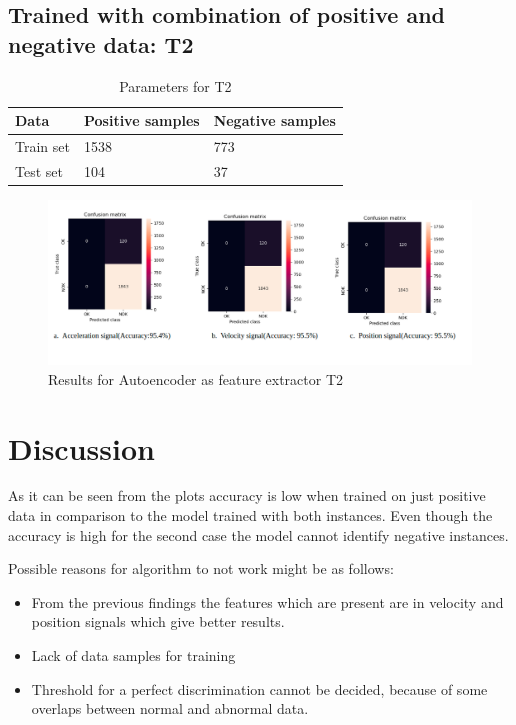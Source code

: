     \subsection{Trained with combination of positive  and negative data: T2}
   \begin{table}[h]
   	\begin{tabular}{|l|l|l|}
   		\hline
   		Data      & Positive samples & Negative samples \\ \hline
   		Train set & 1538             & 773              \\ \hline
   		Test set  & 104              & 37               \\ \hline
   	\end{tabular}
   	   	\caption{Parameters for T2}
   \end{table}
       \begin{figure}[h]
       	\centering
       	\includegraphics[width=1\linewidth]{images/rr8.png}
       	\caption{Results for Autoencoder as feature extractor T2}
       	\label{kk}
       \end{figure}
   \section{Discussion}
   As it can be seen from the plots accuracy is low when trained on just positive data in comparison to the model trained with both instances. Even though the accuracy is high for the second case the model cannot identify negative instances.
     
   Possible reasons for algorithm to not work might be as follows:
   \begin{itemize}
   	\item From the previous findings the features which are present are in velocity and position signals which give better results.
   	\item Lack of data samples for training 
   	\item Threshold for a perfect discrimination cannot be decided, because of some overlaps between normal and abnormal data.	
   \end{itemize}
   

